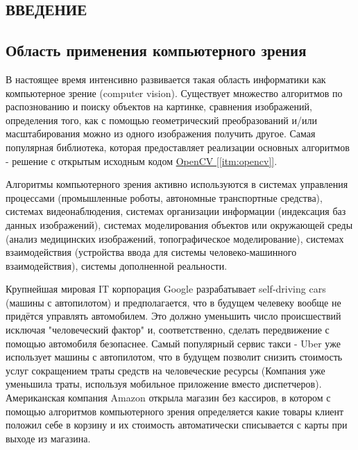 \begin{center}
    \section*{ВВЕДЕНИЕ}    
\end{center}
    \subsection*{Область применения компьютерного зрения}
    
    \tab В настоящее время интенсивно развивается такая область информатики как компьютерное зрение (computer vision). Существует множество алгоритмов по распознованию и поиску объектов на картинке, сравнения изображений, определения того, как с помощью геометрический преобразований и/или масштабирования можно из одного изображения получить другое. Самая популярная библиотека, которая предоставляет реализации основных алгоритмов - решение с открытым исходным кодом \hyperref[itm:opencv]{OpenCV [\ref{itm:opencv}]}.
    
    Алгоритмы компьютерного зрения активно используются в системах управления процессами (промышленные роботы, автономные транспортные средства), системах видеонаблюдения, системах организации информации (индексация баз данных изображений), системах моделирования объектов или окружающей среды (анализ медицинских изображений, топографическое моделирование), системах взаимодействия (устройства ввода для системы человеко-машинного взаимодействия), системы дополненной реальности.
    
    \vspace{1em}
    
    Крупнейшая мировая IT корпорация Google разрабатывает self-driving cars (машины с автопилотом) и предполагается, что в будущем челевеку вообще не придётся управлять автомобилем. Это должно уменьшить число происшествий исключая "человеческий фактор" и, соответственно, сделать передвижение с помощью автомобиля безопаснее. Самый популярный сервис такси - Uber уже использует машины с автопилотом, что в будущем позволит снизить стоимость услуг сокращением траты средств на человеческие ресурсы (Компания уже уменьшила траты, используя мобильное приложение вместо диспетчеров). Американская компания Amazon открыла магазин без кассиров, в котором с помощью алгоритмов компьютерного зрения определяется какие товары клиент положил себе в корзину и их стоимость автоматически списывается с карты при выходе из магазина.
    
